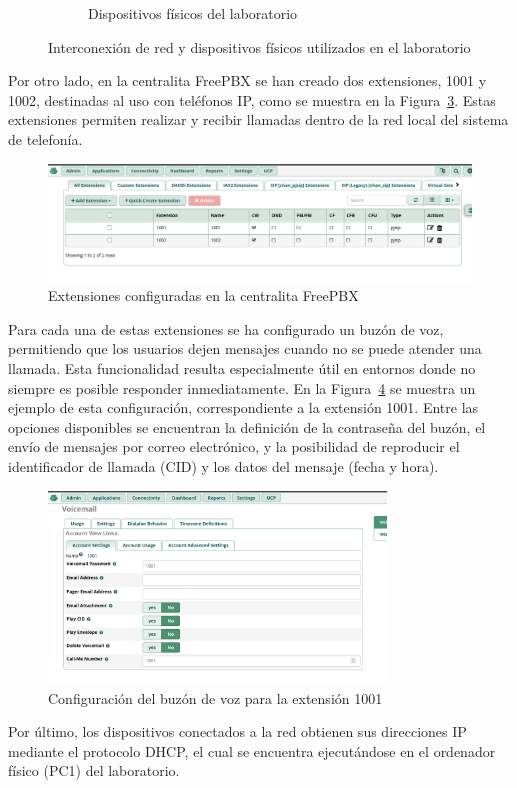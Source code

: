 \begin{figure}[H]
\begin{subfigure}[b]{0.39\textwidth}
		\caption{Dispositivos físicos del laboratorio}
		\label{fig:laboratorio}
	\end{subfigure}
	\caption{Interconexión de red y dispositivos físicos utilizados en el laboratorio}
	\label{fig:interconexion_red_laboratorio}
\end{figure}

Por otro lado, en la centralita FreePBX se han creado dos extensiones, 1001 y 1002, destinadas al uso con teléfonos
IP, como se muestra en la Figura~\ref{fig:extensiones_telefonoIP}. Estas extensiones permiten realizar y recibir
llamadas dentro de la red local del sistema de telefonía.

\begin{figure}[H]
	\centering
	\includegraphics[width=1\textwidth]{images/extensiones_telefonoIP.png}
	\caption{Extensiones configuradas en la centralita FreePBX}
	\label{fig:extensiones_telefonoIP}
\end{figure}

Para cada una de estas extensiones se ha configurado un buzón de voz, permitiendo que los usuarios dejen mensajes
cuando no se puede atender una llamada. Esta funcionalidad resulta especialmente útil en entornos donde no siempre
es posible responder inmediatamente. En la Figura~\ref{fig:configuracion_buzon_voz} se muestra un ejemplo de esta
configuración, correspondiente a la extensión 1001. Entre las opciones disponibles se encuentran la definición de
la contraseña del buzón, el envío de mensajes por correo electrónico, y la posibilidad de reproducir el
identificador de llamada (CID) y los datos del mensaje (fecha y hora).

\begin{figure}[H]
	\centering
	\includegraphics[width=0.8\textwidth]{images/configuracion_buzon_voz.png}
	\caption{Configuración del buzón de voz para la extensión 1001}
	\label{fig:configuracion_buzon_voz}
\end{figure}

Por último, los dispositivos conectados a la red obtienen sus direcciones IP mediante el protocolo DHCP,
el cual se encuentra ejecutándose en el ordenador físico (PC1) del laboratorio.
